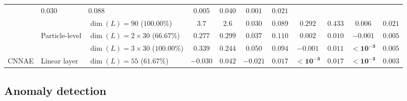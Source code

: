 \begin{table}[ht!]
{\begin{tabular}{lllcccccccc}
         & $\mathit{0.030}$ & $\mathit{0.088}$
         & $\mathit{0.005}$ & $\mathit{0.040}$
         & $\mathit{0.001}$ & ${0.021}$
        \\
         & & $\dim(L) = 90$ ($100.00\%$)
         & ${3.7}$ & $2.6$
         & $\mathit{0.030}$ & ${0.089}$
         & ${0.292}$ & ${0.433}$
         & ${0.006}$ & ${0.021}$
        \\[1mm]
         & \multirow{2}{*}{Particle-level}
         & $\dim(L) = 2 \times 30$ ($66.67\%$)
         & $\mathit{0.277}$ & ${0.299}$
         & $\mathit{0.037}$ & ${0.110}$
         & ${0.002}$ & $\mathit{0.010}$
         & $-0.001$ & ${0.005}$
        \\
         & & $\dim(L) = 3 \times 30$ ($100.00\%$)
         & ${0.339}$ & $\mathit{0.244}$
         & ${0.050}$ & $\mathit{0.094}$
         & $\mathit{-0.001}$ & ${0.011}$
         & $\mathbf{<10^{-3}}$ & ${0.005}$
        \\[2mm]
        CNNAE
        & Linear layer
        & $\dim(L) = 55$ ($61.67\%$)
        & $-0.030$
        & $0.042$
        & $-0.021$
        & $0.017$
        & $\mathbf{< 10^{-3}}$
        & $0.017$
        & $\mathbf{<10^{-3}}$
        & $0.003$ \\
        \bottomrule
    \end{tabular}
    }
\end{table}

\clearpage
\subsection{Anomaly detection}
\label{sec:06_lgae_anomaly}

